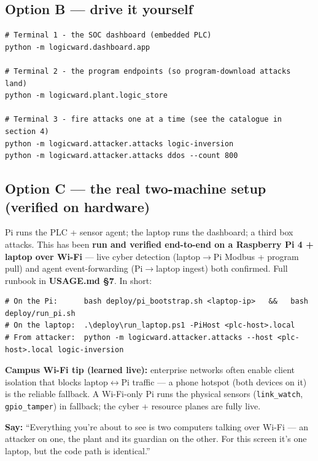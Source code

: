 \documentclass[11pt,a4paper]{article}
\newcommand{\code}[1]{\texttt{\small #1}}
\begin{document}
\subsection{Option B --- drive it yourself}
\begin{lstlisting}
# Terminal 1 - the SOC dashboard (embedded PLC)
python -m logicward.dashboard.app

# Terminal 2 - the program endpoints (so program-download attacks land)
python -m logicward.plant.logic_store

# Terminal 3 - fire attacks one at a time (see the catalogue in section 4)
python -m logicward.attacker.attacks logic-inversion
python -m logicward.attacker.attacks ddos --count 800
\end{lstlisting}

\subsection{Option C --- the real two-machine setup (verified on hardware)}
Pi runs the PLC + sensor agent; the laptop runs the dashboard; a third box attacks. This has
been \textbf{run and verified end-to-end on a Raspberry Pi 4 + laptop over Wi-Fi} --- live cyber
detection (laptop$\rightarrow$Pi Modbus + program pull) and agent event-forwarding
(Pi$\rightarrow$laptop ingest) both confirmed. Full runbook in \textbf{USAGE.md \S7}. In short:
\begin{lstlisting}
# On the Pi:      bash deploy/pi_bootstrap.sh <laptop-ip>   &&   bash deploy/run_pi.sh
# On the laptop:  .\deploy\run_laptop.ps1 -PiHost <plc-host>.local
# From attacker:  python -m logicward.attacker.attacks --host <plc-host>.local logic-inversion
\end{lstlisting}
\begin{note}
\textbf{Campus Wi-Fi tip (learned live):} enterprise networks often enable client isolation
that blocks laptop$\leftrightarrow$Pi traffic --- a phone hotspot (both devices on it) is the
reliable fallback. A Wi-Fi-only Pi runs the physical sensors (\code{link\_watch},
\code{gpio\_tamper}) in fallback; the cyber + resource planes are fully live.
\end{note}

\begin{say}
\textbf{Say:} ``Everything you're about to see is two computers talking over Wi-Fi --- an
attacker on one, the plant and its guardian on the other. For this screen it's one laptop,
but the code path is identical.''
\end{say}
\end{document}
